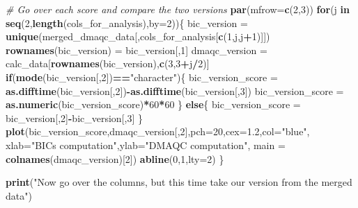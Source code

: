 \documentclass[]{article}
\newenvironment{Shaded}{\begin{snugshade}}{\end{snugshade}}
\newcommand{\KeywordTok}[1]{\textcolor[rgb]{0.13,0.29,0.53}{\textbf{#1}}}
\newcommand{\DataTypeTok}[1]{\textcolor[rgb]{0.13,0.29,0.53}{#1}}
\newcommand{\DecValTok}[1]{\textcolor[rgb]{0.00,0.00,0.81}{#1}}
\newcommand{\FloatTok}[1]{\textcolor[rgb]{0.00,0.00,0.81}{#1}}
\newcommand{\StringTok}[1]{\textcolor[rgb]{0.31,0.60,0.02}{#1}}
\newcommand{\CommentTok}[1]{\textcolor[rgb]{0.56,0.35,0.01}{\textit{#1}}}
\newcommand{\ControlFlowTok}[1]{\textcolor[rgb]{0.13,0.29,0.53}{\textbf{#1}}}
\newcommand{\OperatorTok}[1]{\textcolor[rgb]{0.81,0.36,0.00}{\textbf{#1}}}
\newcommand{\NormalTok}[1]{#1}
\begin{document}
\begin{Shaded}
\begin{Highlighting}[]
\CommentTok{# Go over each score and compare the two versions}
\KeywordTok{par}\NormalTok{(}\DataTypeTok{mfrow=}\KeywordTok{c}\NormalTok{(}\DecValTok{2}\NormalTok{,}\DecValTok{3}\NormalTok{))}
\ControlFlowTok{for}\NormalTok{(j }\ControlFlowTok{in} \KeywordTok{seq}\NormalTok{(}\DecValTok{2}\NormalTok{,}\KeywordTok{length}\NormalTok{(cols_for_analysis),}\DataTypeTok{by=}\DecValTok{2}\NormalTok{))\{}
\NormalTok{  bic_version =}\StringTok{ }\KeywordTok{unique}\NormalTok{(merged_dmaqc_data[,cols_for_analysis[}\KeywordTok{c}\NormalTok{(}\DecValTok{1}\NormalTok{,j,j}\OperatorTok{+}\DecValTok{1}\NormalTok{)]])}
  \KeywordTok{rownames}\NormalTok{(bic_version) =}\StringTok{ }\NormalTok{bic_version[,}\DecValTok{1}\NormalTok{]}
\NormalTok{  dmaqc_version =}\StringTok{ }\NormalTok{calc_data[}\KeywordTok{rownames}\NormalTok{(bic_version),}\KeywordTok{c}\NormalTok{(}\DecValTok{3}\NormalTok{,}\DecValTok{3}\OperatorTok{+}\NormalTok{j}\OperatorTok{/}\DecValTok{2}\NormalTok{)]}
  \ControlFlowTok{if}\NormalTok{(}\KeywordTok{mode}\NormalTok{(bic_version[,}\DecValTok{2}\NormalTok{])}\OperatorTok{==}\StringTok{"character"}\NormalTok{)\{}
\NormalTok{    bic_version_score =}\StringTok{ }\KeywordTok{as.difftime}\NormalTok{(bic_version[,}\DecValTok{2}\NormalTok{])}\OperatorTok{-}\KeywordTok{as.difftime}\NormalTok{(bic_version[,}\DecValTok{3}\NormalTok{])}
\NormalTok{    bic_version_score =}\StringTok{ }\KeywordTok{as.numeric}\NormalTok{(bic_version_score)}\OperatorTok{*}\DecValTok{60}\OperatorTok{*}\DecValTok{60}
\NormalTok{  \}}
  \ControlFlowTok{else}\NormalTok{\{}
\NormalTok{    bic_version_score =}\StringTok{ }\NormalTok{bic_version[,}\DecValTok{2}\NormalTok{]}\OperatorTok{-}\NormalTok{bic_version[,}\DecValTok{3}\NormalTok{]}
\NormalTok{  \}}
  \KeywordTok{plot}\NormalTok{(bic_version_score,dmaqc_version[,}\DecValTok{2}\NormalTok{],}\DataTypeTok{pch=}\DecValTok{20}\NormalTok{,}\DataTypeTok{cex=}\FloatTok{1.2}\NormalTok{,}\DataTypeTok{col=}\StringTok{"blue"}\NormalTok{,}
       \DataTypeTok{xlab=}\StringTok{"BICs computation"}\NormalTok{,}\DataTypeTok{ylab=}\StringTok{"DMAQC computation"}\NormalTok{,}
       \DataTypeTok{main =} \KeywordTok{colnames}\NormalTok{(dmaqc_version)[}\DecValTok{2}\NormalTok{])}
  \KeywordTok{abline}\NormalTok{(}\DecValTok{0}\NormalTok{,}\DecValTok{1}\NormalTok{,}\DataTypeTok{lty=}\DecValTok{2}\NormalTok{)}
\NormalTok{\}}

\KeywordTok{print}\NormalTok{(}\StringTok{"Now go over the columns, but this time take our version from the merged data"}\NormalTok{)}
\end{Highlighting}
\end{Shaded}
\end{document}
